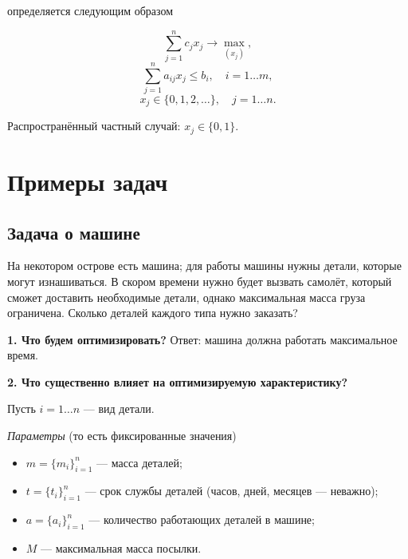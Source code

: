 
 определяется следующим образом

\[\sum_{j=1}^{n} c_j x_j \to \max_{(x_j)},\]
\[\sum_{j=1}^{n}a_{ij} x_j \le b_i, \quad i = 1\dots m,\]
\[x_j \in \{0, 1, 2, \dots\}, \quad j = 1\dots n.\]

Распространённый частный случай: $x_j \in \{0, 1\}$.

\section{Примеры задач}

\subsection{Задача о машине}

\problem\label{pr:car_on_island}

На некотором острове есть машина; для работы машины нужны детали, которые могут изнашиваться. В скором времени нужно будет вызвать самолёт, который сможет доставить необходимые детали, однако максимальная масса груза ограничена. Сколько деталей каждого типа нужно заказать?

\mathmodel

\textbf{1. Что будем оптимизировать?} Ответ: машина должна работать максимальное время.

\bigskip

\textbf{2. Что существенно влияет на оптимизируемую характеристику?}

Пусть $i = 1 \dots n$ --- вид детали.

\bigskip

\textit{Параметры} (то есть фиксированные значения)

\begin{itemize}[nosep]
	\item $m = \{m_i\}_{i=1}^n$ --- масса деталей;
	
	\item $t = \{t_i\}_{i=1}^n$ --- срок службы деталей (часов, дней, месяцев --- неважно);

	\item $a = \{a_i\}_{i=1}^n$ --- количество работающих деталей в машине;
	
	\item $M$ --- максимальная масса посылки.
\end{itemize}

\bigskip

